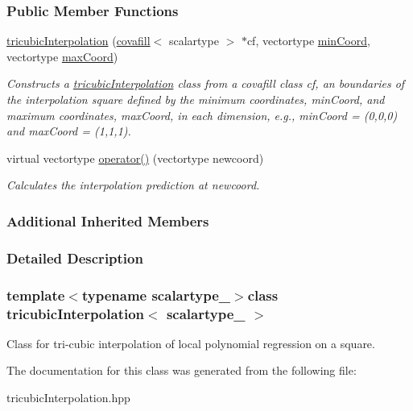 \subsubsection*{Public Member Functions}
\begin{DoxyCompactItemize}
\item 
\hypertarget{classtricubicInterpolation_ad5e9cb968974cea893a884a7f0420111}{}\hyperlink{classtricubicInterpolation_ad5e9cb968974cea893a884a7f0420111}{tricubic\+Interpolation} (\hyperlink{classcovafill}{covafill}$<$ scalartype $>$ $\ast$cf, vectortype \hyperlink{classncubicInterpolation_a5360669149e2182a478f74941c4fb008}{min\+Coord}, vectortype \hyperlink{classncubicInterpolation_a3bd706effb987f94c92f4c89605c7e7c}{max\+Coord})\label{classtricubicInterpolation_ad5e9cb968974cea893a884a7f0420111}

\begin{DoxyCompactList}\small\item\em Constructs a \hyperlink{classtricubicInterpolation}{tricubic\+Interpolation} class from a covafill class {\itshape cf}, an boundaries of the interpolation square defined by the minimum coordinates, {\itshape min\+Coord}, and maximum coordinates, {\itshape max\+Coord}, in each dimension, e.\+g., min\+Coord = (0,0,0) and max\+Coord = (1,1,1). \end{DoxyCompactList}\item 
\hypertarget{classtricubicInterpolation_a8554c02565bafd34a90e3af5350e1e59}{}virtual vectortype \hyperlink{classtricubicInterpolation_a8554c02565bafd34a90e3af5350e1e59}{operator()} (vectortype newcoord)\label{classtricubicInterpolation_a8554c02565bafd34a90e3af5350e1e59}

\begin{DoxyCompactList}\small\item\em Calculates the interpolation prediction at {\itshape newcoord}. \end{DoxyCompactList}\end{DoxyCompactItemize}
\subsubsection*{Additional Inherited Members}


\subsubsection{Detailed Description}
\subsubsection*{template$<$typename scalartype\+\_\+$>$class tricubic\+Interpolation$<$ scalartype\+\_\+ $>$}

Class for tri-\/cubic interpolation of local polynomial regression on a square. 

The documentation for this class was generated from the following file\+:\begin{DoxyCompactItemize}
\item 
tricubic\+Interpolation.\+hpp\end{DoxyCompactItemize}
